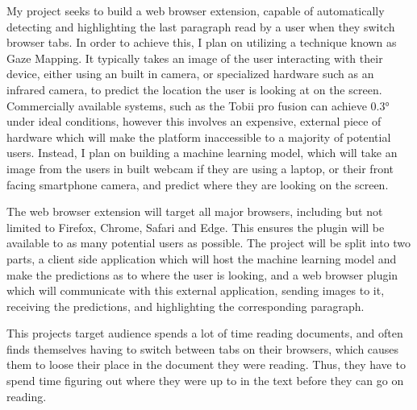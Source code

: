 \documentclass[twocolumn]{report}
\begin{document}
\noindent
My project seeks to build a web browser extension, capable of automatically detecting and highlighting the last paragraph read by a user when they switch browser tabs. In order to achieve this, I plan on utilizing a technique known as Gaze Mapping. It typically takes an image of the user interacting with their device, either using an built in camera, or specialized hardware such as an infrared camera, to predict the location the user is looking at on the screen. Commercially available systems, such as the Tobii pro fusion can achieve $\ang{0.3}$ under ideal conditions, however this involves an expensive, external piece of hardware which will make the platform inaccessible to a majority of potential users. Instead, I plan on building a machine learning model, which will take an image from the users in built webcam if they are using a laptop, or their front facing smartphone camera, and predict where they are looking on the screen. 


The web browser extension will target all major browsers, including but not limited to Firefox, Chrome, Safari and Edge. This ensures the plugin will be available to as many potential users as possible. The project will be split into two parts, a client side application which will host the machine learning model and make the predictions as to where the user is looking, and a web browser plugin which will communicate with this external application, sending images to it, receiving the predictions, and highlighting the corresponding paragraph. 

This projects target audience spends a lot of time reading documents, and often finds themselves having to switch between tabs on their browsers, which causes them to loose their place in the document they were reading. Thus, they have to spend time figuring out where they were up to in the text before they can go on reading. 

    
\end{document}
